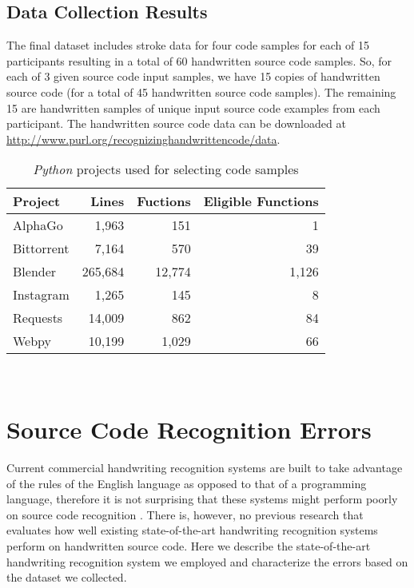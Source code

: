 \documentclass{vgtc}                          %
\begin{document}
\subsection{Data Collection Results}
The final dataset includes stroke data for four code samples for each of 15 participants resulting in a total of 60 handwritten source code samples. So, for each of 3 given source code input samples, we have 15 copies of handwritten source code (for a total of 45 handwritten source code samples). The remaining 15 are handwritten samples of unique input source code examples from each participant. 
The handwritten source code data can be downloaded at \newline \url{http://www.purl.org/recognizinghandwrittencode/data}.
 
\begin{table}
  \centering
  \begin{tabular}{l r r r}
    {Project}
    & {Lines}
      & {Fuctions}
    & {Eligible Functions} \\
    \midrule
    AlphaGo & 1,963 & 151 & 1 \\
    Bittorrent & 7,164 &  570 & 39 \\
    Blender & 265,684  & 12,774 & 1,126 \\
    Instagram & 1,265 & 145 & 8 \\
    Requests & 14,009  & 862 & 84 \\
    Webpy & 10,199 & 1,029 & 66 \\
  \end{tabular}
  \caption{\textit{Python} projects used for selecting code samples}~\label{table:project}
\end{table}



\section{Source Code Recognition Errors}

Current commercial handwriting recognition systems are built to take advantage of the rules of the English language as opposed to that of a programming language, therefore it is not surprising that these systems might perform poorly on source code recognition \cite{frye2008pdp}. There is, however, no previous research that evaluates how well existing state-of-the-art handwriting recognition systems perform on handwritten source code. Here we describe the state-of-the-art handwriting recognition system we employed and characterize the errors based on the dataset we collected.
\end{document}
